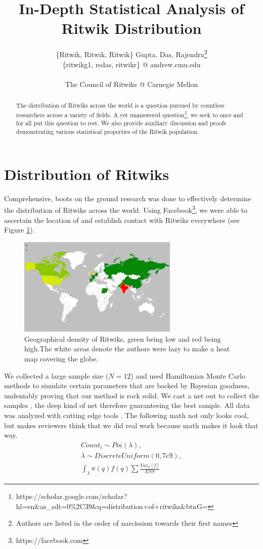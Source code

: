 \documentclass[]{article}
\title{In-Depth Statistical Analysis of Ritwik Distribution}
\author{\{Ritwik, Ritwik, Ritwik\} Gupta, Das, Rajendra\footnote{Authors are listed in the order of narcissism towards their first names}
	\\
	\{ritwikg1, rsdas, ritwikr\} @ andrew.cmu.edu
	\\
	\\
	The Council of Ritwiks @ Carnegie Mellon}
\date{}
\begin{document}
\maketitle

\begin{abstract}
The distribution of Ritwiks across the world is a question pursued by countless researchers across a variety of fields. A yet unanswered question\footnote{https://scholar.google.com/scholar?hl=en\&as\_sdt=0\%2C39\&q=distribution+of+ritwiks\&btnG=}, we seek to once and for all put this question to rest. We also provide auxiliary discussion and proofs demonstrating various statistical properties of the Ritwik population.
\end{abstract}

\section{Distribution of Ritwiks}
Comprehensive, boots on the ground research was done to effectively determine the distribution of Ritwiks across the world. Using Facebook\footnote{https://facebook.com}, we were able to ascertain the location of and establish contact with Ritwiks everywhere (see Figure \ref{fig:ritwikgeographicaldistro}).
\begin{figure}[h]
	\centering
	\includegraphics[width=3in]{figures/RitwikGeographicalDistro}
	\caption{Geographical density of Ritwiks, green being low and red being high.The white areas denote the authors were lazy to make a heat map covering the globe.}
	\label{fig:ritwikgeographicaldistro}
\end{figure}
We collected a large sample size ($N = 12$) and used Hamiltonian Monte Carlo methods to simulate certain parameters that are backed by Bayesian goodness, undeniably proving that our method is rock solid. We cast a net out to collect the samples , the deep kind of net therefore guaranteeing the best sample. All data was analyzed with cutting edge tools \cite{Zaharia:2012:RDD:2228298.2228301, PyMC3}. The following math not only looks cool, but makes reviewers think that we did real work because math makes it look that way.
\begin{subequations}
\begin{align}
Count_i \sim Poi(\lambda),\\
\lambda \sim DiscreteUniform(0, 7e9),\\
\int_{\lambda}\pi(q)f(q)\sum{\frac{Var_\pi[f]}{ESS}}
\end{align}
\end{subequations}
\vspace{1in}
\end{document}
